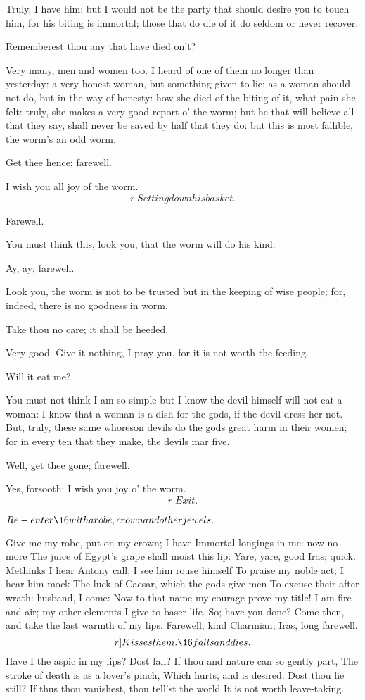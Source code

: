 \documentclass{book}
\begin{document}
\begin{PROSE}

	Truly, I have him: but I would not be the party
	that should desire you to touch him, for his biting
	is immortal; those that do die of it do seldom or
	never recover.

\2	Rememberest thou any that have died on't?

	Very many, men and women too. I heard of one of
	them no longer than yesterday: a very honest woman,
	but something given to lie; as a woman should not
	do, but in the way of honesty: how she died of the
	biting of it, what pain she felt: truly, she makes
	a very good report o' the worm; but he that will
	believe all that they say, shall never be saved by
	half that they do: but this is most fallible, the
	worm's an odd worm.

\2	Get thee hence; farewell.

	I wish you all joy of the worm.
   \[r]Setting down his basket.\]

\2	Farewell.

	You must think this, look you, that the worm will
	do his kind.

\2	Ay, ay; farewell.

	Look you, the worm is not to be trusted but in the
	keeping of wise people; for, indeed, there is no
	goodness in worm.


\2	Take thou no care; it shall be heeded.

	Very good. Give it nothing, I pray you, for it is
	not worth the feeding.

\2	Will it eat me?

	You must not think I am so simple but I know the
	devil himself will not eat a woman: I know that a
	woman is a dish for the gods, if the devil dress her
	not. But, truly, these same whoreson devils do the
	gods great harm in their women; for in every ten
	that they make, the devils mar five.

\2	Well, get thee gone; farewell.

	Yes, forsooth: I wish you joy o' the worm. \[r]Exit.\]

\end{PROSE}

	\(Re-enter \16 with a robe, crown and other jewels.\)

\2	Give me my robe, put on my crown; I have
	Immortal longings in me: now no more
	The juice of Egypt's grape shall moist this lip:
	Yare, yare, good Iras; quick. Methinks I hear
	Antony call; I see him rouse himself
	To praise my noble act; I hear him mock
	The luck of Caesar, which the gods give men
	To excuse their after wrath: husband, I come:
	Now to that name my courage prove my title!
	I am fire and air; my other elements
	I give to baser life. So; have you done?
	Come then, and take the last warmth of my lips.
	Farewell, kind Charmian; Iras, long farewell.
	\[r]Kisses them. \16 falls and dies.\]
	Have I the aspic in my lips? Dost fall?
	If thou and nature can so gently part,
	The stroke of death is as a lover's pinch,
	Which hurts, and is desired. Dost thou lie still?
	If thus thou vanishest, thou tell'st the world
	It is not worth leave-taking.
\end{document}
